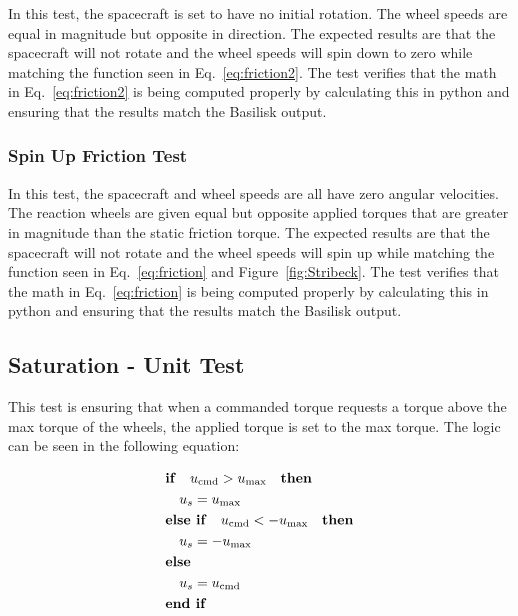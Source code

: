 In this test, the spacecraft is set to have no initial rotation. The wheel speeds are equal in magnitude but opposite in direction. The expected results are that the spacecraft will not rotate and the wheel speeds will spin down to zero while matching the function seen in Eq.~\eqref{eq:friction2}. The test verifies that the math in Eq.~\eqref{eq:friction2} is being computed properly by calculating this in python and ensuring that the results match the Basilisk output.

\subsubsection{Spin Up Friction Test}

In this test, the spacecraft and wheel speeds are all have zero angular velocities. The reaction wheels are given equal but opposite applied torques that are greater in magnitude than the static friction torque. The expected results are that the spacecraft will not rotate and the wheel speeds will spin up while matching the function seen in Eq.~\eqref{eq:friction} and Figure~\ref{fig:Stribeck}. The test verifies that the math in Eq.~\eqref{eq:friction} is being computed properly by calculating this in python and ensuring that the results match the Basilisk output.

\subsection{Saturation - Unit Test}

This test is ensuring that when a commanded torque requests a torque above the max torque of the wheels, the applied torque is set to the max torque. The logic can be seen in the following equation:

\begin{equation}
\begin{gathered}
\begin{aligned}
&\textnormal{\textbf{if}}\quad u_{\textnormal{cmd}} > u_{\textnormal{max}}  \quad \textnormal{\textbf{then}}\\
&\quad u_s = u_{\textnormal{max}} \\
&\textnormal{\textbf{else if}}\quad u_{\textnormal{cmd}} < - u_{\textnormal{max}}  \quad \textnormal{\textbf{then}}\\
&\quad u_s =  - u_{\textnormal{max}} \\
&\textnormal{\textbf{else}}\\
&\quad u_s = u_{\textnormal{cmd}}\\
&\textnormal{\textbf{end if}}\\
\end{aligned}
\end{gathered}
\label{eq:ballin}
\end{equation}

